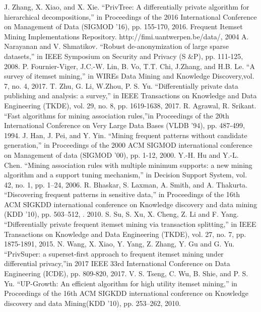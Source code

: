 \documentclass[conference]{IEEEtran}
\begin{document}
\begin{thebibliography}{21}
    J. Zhang, X. Xiao, and X. Xie. ``PrivTree: A differentially private algorithm for hierarchical decompositions,'' in Proceedings of the 2016 International Conference on Management of Data (SIGMOD '16), pp. 155-170, 2016.
    Frequent Itemset Mining Implementations Repository. http://fimi.uantwerpen.be/data/, 2004
    A. Narayanan and V. Shmatikov. ``Robust de-anonymization of large sparse datasets,'' in IEEE Symposium on Security and Privacy (S \&P), pp. 111-125, 2008.
    P. Fournier-Viger, J.C.-W. Lin, B. Vo, T.T. Chi, J.Zhang, and H.B. Le. ``A survey of itemset mining,'' in WIREs Data Mining and Knowledge Discovery,vol. 7, no. 4, 2017.
    T. Zhu, G. Li, W.Zhou, P. S. Yu. ``Differentially private data publishing and analysis: a survey,'' in IEEE Transactions on Knowledge and Data Engineering (TKDE), vol. 29, no. 8, pp. 1619-1638, 2017.
    R. Agrawal, R. Srikant. ``Fast algorithms for mining association rules,''in Proceedings of the 20th International Conference on Very Large Data Bases (VLDB '94), pp. 487-499, 1994.
    J. Han, J. Pei, and Y. Yin. ``Mining frequent patterns without candidate generation,'' in Proceedings of the 2000 ACM SIGMOD international conference on Management of data (SIGMOD '00), pp. 1-12, 2000.
    Y.-H. Hu and Y.-L. Chen. ``Mining association rules with multiple minimum supports: a new mining algorithm and a support tuning mechanism,'' in Decision Support System, vol. 42, no. 1, pp. 1–24, 2006.
    R. Bhaskar, S. Laxman, A. Smith, and A. Thakurta. ``Discovering frequent patterns in sensitive data,'' in Proceedings of the 16th ACM SIGKDD international conference on Knowledge discovery and data mining (KDD '10), pp. 503–512, . 2010.
    S. Su, S. Xu, X. Cheng, Z. Li and F. Yang. ``Differentially private frequent itemset mining via transaction splitting,'' in IEEE Transactions on Knowledge and Data Engineering (TKDE), vol. 27, no. 7, pp. 1875-1891, 2015.
    N. Wang, X. Xiao, Y. Yang, Z. Zhang, Y. Gu and G. Yu. ``PrivSuper: a superset-first approach to frequent itemset mining under differential privacy,''in 2017 IEEE 33rd International Conference on Data Engineering (ICDE), pp. 809-820, 2017.
    V. S. Tseng, C. Wu, B. Shie, and P. S. Yu. ``UP-Growth: An efficient algorithm for high utility itemset mining,'' in Proceedings of the 16th ACM SIGKDD international conference on Knowledge discovery and data Mining(KDD '10), pp. 253–262, 2010.
\end{thebibliography}
\end{document}

